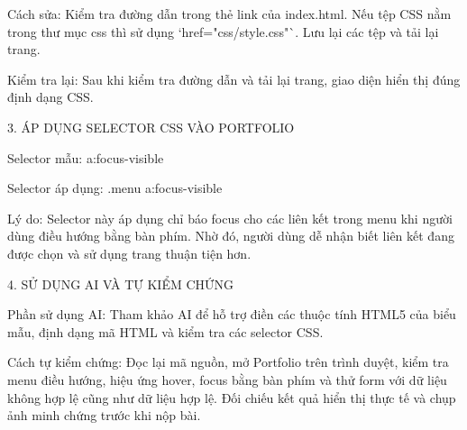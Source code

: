 Cách sửa: Kiểm tra đường dẫn trong thẻ link của index.html. Nếu tệp CSS nằm trong thư mục css thì sử dụng `href="css/style.css"`. Lưu lại các tệp và tải lại trang.

Kiểm tra lại: Sau khi kiểm tra đường dẫn và tải lại trang, giao diện hiển thị đúng định dạng CSS.

3. ÁP DỤNG SELECTOR CSS VÀO PORTFOLIO

Selector mẫu: a:focus-visible

Selector áp dụng: .menu a:focus-visible

Lý do: Selector này áp dụng chỉ báo focus cho các liên kết trong menu khi người dùng điều hướng bằng bàn phím. Nhờ đó, người dùng dễ nhận biết liên kết đang được chọn và sử dụng trang thuận tiện hơn.

4. SỬ DỤNG AI VÀ TỰ KIỂM CHỨNG

Phần sử dụng AI: Tham khảo AI để hỗ trợ điền các thuộc tính HTML5 của biểu mẫu, định dạng mã HTML và kiểm tra các selector CSS.

Cách tự kiểm chứng: Đọc lại mã nguồn, mở Portfolio trên trình duyệt, kiểm tra menu điều hướng, hiệu ứng hover, focus bằng bàn phím và thử form với dữ liệu không hợp lệ cũng như dữ liệu hợp lệ. Đối chiếu kết quả hiển thị thực tế và chụp ảnh minh chứng trước khi nộp bài.